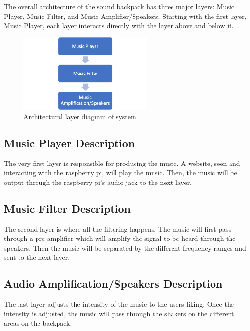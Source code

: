 The overall architecture of the sound backpack has three major layers: Music Player, Music Filter, and Music Amplifier/Speakers. Starting with the first layer, Music Player, each layer interacts directly with the layer above and below it.
\begin{figure}[h!]
	\centering
 	\includegraphics[width=0.60\textwidth]{images/layers}
 \caption{Architectural layer diagram of system}
\end{figure}

\subsection{Music Player Description}
The very first layer is responsible for producing the music. A website, seen and interacting with the raspberry pi, will play the music. Then, the music will be output through the raspberry pi's audio jack to the next layer. 

\subsection{Music Filter Description}
The second layer is where all the filtering happens. The music will first pass through a pre-amplifier which will amplify the signal to be heard through the speakers. Then the music will be separated by the different frequency ranges and sent to the next layer. 

\subsection{Audio Amplification/Speakers Description}
The last layer adjusts the intensity of the music to the users liking. Once the intensity is adjusted, the music will pass through the shakers on the different areas on the backpack. 

